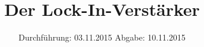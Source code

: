 

\subject{Versuch 303}
\title{Der Lock-In-Verstärker}
\date{
  Durchführung: 03.11.2015
  \hspace{3em}
  Abgabe: 10.11.2015
}



\maketitle
\thispagestyle{empty}

\tableofcontents
\newpage



\newpage


\newpage

\newpage
\nocite{*}
\printbibliography


